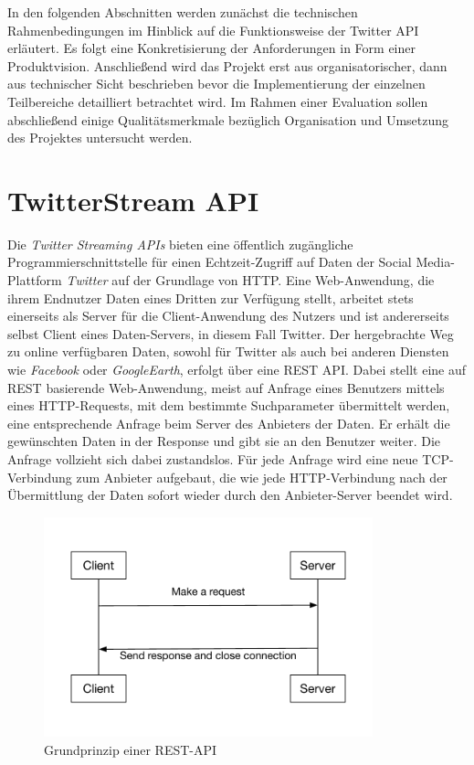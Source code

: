 In den folgenden Abschnitten werden zunächst die technischen Rahmenbedingungen im Hinblick auf die Funktionsweise der Twitter API erläutert. Es folgt eine Konkretisierung der Anforderungen in Form einer Produktvision. Anschließend wird das Projekt erst aus organisatorischer, dann aus technischer Sicht beschrieben bevor die Implementierung der einzelnen Teilbereiche detailliert betrachtet wird. Im Rahmen einer Evaluation sollen abschließend einige Qualitätsmerkmale bezüglich Organisation und Umsetzung des Projektes untersucht werden.
\newpage
\section{TwitterStream API}
%
Die \textit{Twitter Streaming APIs} bieten eine öffentlich zugängliche Programmierschnittstelle für einen Echtzeit-Zugriff auf Daten der Social Media-Plattform \textit{Twitter} auf der Grundlage von HTTP. Eine Web-Anwendung, die ihrem Endnutzer Daten eines Dritten zur Verfügung stellt, arbeitet stets einerseits als Server für die Client-Anwendung des Nutzers und ist andererseits selbst Client eines Daten-Servers, in diesem Fall Twitter. Der hergebrachte Weg zu online verfügbaren Daten, sowohl für Twitter als auch bei anderen Diensten wie \textit{Facebook} oder \textit{GoogleEarth}, erfolgt über eine REST API. Dabei stellt eine auf REST basierende Web-Anwendung, meist auf Anfrage eines Benutzers mittels eines HTTP-Requests, mit dem bestimmte Suchparameter übermittelt werden, eine entsprechende Anfrage beim Server des Anbieters der Daten. Er erhält die gewünschten Daten in der Response und gibt sie an den Benutzer weiter. Die Anfrage vollzieht sich dabei zustandslos. Für jede Anfrage wird eine neue \acs{TCP}-Verbindung zum Anbieter aufgebaut, die wie jede HTTP-Verbindung nach der Übermittlung der Daten sofort wieder durch den Anbieter-Server beendet wird.
%
\begin{figure}[!h]
    \centering
    \includegraphics[width=0.85\textwidth]{Graphics/normal_rest_api}
    \caption[Grundprinzip einer REST-API, in Anlehnung an \cite{quora:api}]{Grundprinzip einer REST-API \cite{quora:api}}
   \label{fig:restapi}
\end{figure}
